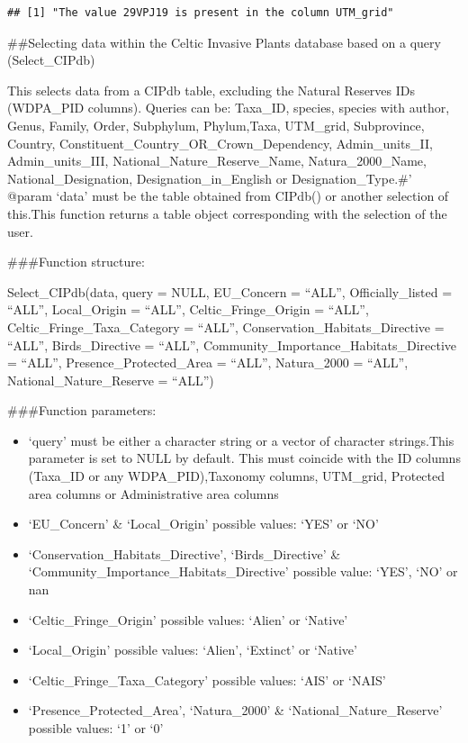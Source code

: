 \documentclass[
]{article}
\providecommand{\tightlist}{%
  \setlength{\itemsep}{0pt}\setlength{\parskip}{0pt}}
\begin{document}
\begin{verbatim}
## [1] "The value 29VPJ19 is present in the column UTM_grid"
\end{verbatim}

\#\#Selecting data within the Celtic Invasive Plants database based on a
query (Select\_CIPdb)

This selects data from a CIPdb table, excluding the Natural Reserves IDs
(WDPA\_PID columns). Queries can be: Taxa\_ID, species, species with
author, Genus, Family, Order, Subphylum, Phylum,Taxa, UTM\_grid,
Subprovince, Country, Constituent\_Country\_OR\_Crown\_Dependency,
Admin\_units\_II, Admin\_units\_III, National\_Nature\_Reserve\_Name,
Natura\_2000\_Name, National\_Designation, Designation\_in\_English or
Designation\_Type.\#' @param `data' must be the table obtained from
CIPdb() or another selection of this.This function returns a table
object corresponding with the selection of the user.

\#\#\#Function structure:

Select\_CIPdb(data, query = NULL, EU\_Concern = ``ALL'',
Officially\_listed = ``ALL'', Local\_Origin = ``ALL'',
Celtic\_Fringe\_Origin = ``ALL'', Celtic\_Fringe\_Taxa\_Category =
``ALL'', Conservation\_Habitats\_Directive = ``ALL'', Birds\_Directive =
``ALL'', Community\_Importance\_Habitats\_Directive = ``ALL'',
Presence\_Protected\_Area = ``ALL'', Natura\_2000 = ``ALL'',
National\_Nature\_Reserve = ``ALL'')

\#\#\#Function parameters:

\begin{itemize}
\tightlist
\item
  `query' must be either a character string or a vector of character
  strings.This parameter is set to NULL by default. This must coincide
  with the ID columns (Taxa\_ID or any WDPA\_PID),Taxonomy columns,
  UTM\_grid, Protected area columns or Administrative area columns
\item
  `EU\_Concern' \& `Local\_Origin' possible values: `YES' or `NO'
\item
  `Conservation\_Habitats\_Directive', `Birds\_Directive' \&
  `Community\_Importance\_Habitats\_Directive' possible value: `YES',
  `NO' or nan
\item
  `Celtic\_Fringe\_Origin' possible values: `Alien' or `Native'
\item
  `Local\_Origin' possible values: `Alien', `Extinct' or `Native'
\item
  `Celtic\_Fringe\_Taxa\_Category' possible values: `AIS' or `NAIS'
\item
  `Presence\_Protected\_Area', `Natura\_2000' \&
  `National\_Nature\_Reserve' possible values: `1' or `0'
\end{itemize}
\end{document}
